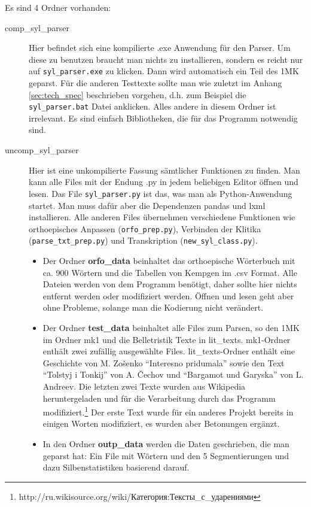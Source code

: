 \documentclass[12pt,headsepline,a4paper]{scrartcl}
\newcommand\textcyr[1]{{\fontencoding{OT2}\fontfamily{wncyr}\selectfont #1}}
\begin{document}
Es sind 4 Ordner vorhanden:
\begin{description}
\item[comp\_syl\_parser] Hier befindet sich eine kompilierte .exe Anwendung für den Parser. Um diese zu benutzen braucht man nichts zu installieren, sondern es reicht nur auf \texttt{syl\_parser.exe} zu klicken. Dann wird automatisch ein Teil des 1MK geparst. Für die anderen Testtexte sollte man wie zuletzt im Anhang \ref{sec:tech_spec} beschrieben vorgehen, d.h. zum Beispiel die \texttt{syl\_parser.bat} Datei anklicken. Alles andere in diesem Ordner ist irrelevant. Es sind einfach Bibliotheken, die für das Programm notwendig sind. 
\item[uncomp\_syl\_parser] Hier ist eine unkompilierte Fassung sämtlicher Funktionen zu finden. Man kann alle Files mit der Endung .py in jedem beliebigen Editor öffnen und lesen. Das File \texttt{syl\_parser.py} ist das, was man als Python-Anwendung startet. Man muss dafür aber die Dependenzen pandas und lxml installieren. Alle anderen Files übernehmen verschiedene Funktionen wie orthoepisches Anpassen (\texttt{orfo\_prep.py}), Verbinden der Klitika (\texttt{parse\_txt\_prep.py}) und Transkription (\texttt{new\_syl\_class.py}).
\begin{itemize}
  \item Der Ordner \textbf{orfo\_data} beinhaltet das orthoepische Wörterbuch mit ca. 900 Wörtern und die Tabellen von Kempgen im .csv Format. Alle Dateien werden von dem Programm benötigt, daher sollte hier nichts entfernt werden oder modifiziert werden. Öffnen und lesen geht aber ohne Probleme, solange man die Kodierung nicht verändert.
  \item Der Ordner \textbf{test\_data} beinhaltet alle Files zum Parsen, so den 1MK im Ordner mk1 und die Belletristik Texte in lit\_texts. mk1-Ordner enthält zwei zufällig ausgewählte Files. lit\_texts-Ordner enthält eine Geschichte von M. Zošenko "`Interesno pridumala"' sowie den Text "`Tolstyj i Tonkij"' von A. Čechov und "`Bargamot und Garyska"' von L. Andreev. Die letzten zwei Texte wurden aus Wikipedia heruntergeladen und für die Verarbeitung durch das Programm modifiziert.\footnote{http://ru.wikisource.org/wiki/\textcyr{Категория:Тексты\_с\_ударениями}} Der erste Text wurde für ein anderes Projekt bereits in einigen Worten modifiziert, es wurden aber Betonungen ergänzt.
  \item In den Ordner \textbf{outp\_data} werden die Daten geschrieben, die man geparst hat: Ein File mit Wörtern und den 5 Segmentierungen und dazu Silbenstatistiken basierend darauf.
 

\end{itemize}
\end{description}
\end{document}
